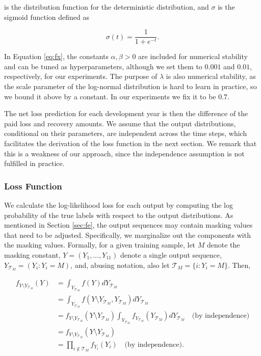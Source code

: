 \documentclass{article}
\begin{document}
is the distribution function for the deterministic distribution, and $\sigma$ 
is the sigmoid function defined as

\begin{equation}
    \sigma(t) = \frac{1}{1 + e^{-t}}.
\end{equation}

In Equation \ref{eq:fx}, the constants $\alpha, \beta > 0$ are included for 
numerical stability and can be tuned as hyperparameters, although we set them 
to $0.001$ and $0.01$, respectively, for our experiments. The purpose of 
$\lambda$ is also numerical stability, as the scale parameter of the log-normal
distribution is hard to learn in practice, so we bound it above by a constant. 
In our experiments we fix it to be $0.7$.

The net loss prediction for each development year is then the difference of the 
paid loss and recovery amounts. We assume that the output distributions, 
conditional on their parameters, are independent across the time steps, which 
facilitates the derivation of the loss function in the next section. We remark 
that this is a weakness of our approach, since the independence assumption is
not fulfilled in practice.

\subsubsection{Loss Function}\label{sec:loss-function}

We calculate the log-likelihood loss for each output by computing the log 
probability of the true labels with respect to the output distributions. As
mentioned in Section \ref{sec:fe}, the output sequences may contain masking 
values that need to be adjusted. Specifically, we marginalize out the components
with the masking values. Formally, for a given training sample, let $M$ denote 
the masking constant, $Y=(Y_1,\dots,Y_{11})$ denote a single output sequence,
$Y_{\mathcal{T}_M} = (Y_i: Y_i = M)$, and, abusing notation, also let 
$\mathcal{T}_M = \{i: Y_i = M\}$. Then,

\begin{align}
    f_{Y\setminus Y_{\mathcal{T}_M}}(Y) &= \int_{Y_{\mathcal{T}_M}} f(Y) dY_{\mathcal{T}_M}\\
         &= \int_{Y_{\mathcal{T}_M}} f(Y\setminus Y_{\mathcal{T}_M}, Y_{\mathcal{T}_M}) dY_{\mathcal{T}_M}\\
         &= f_{Y\setminus Y_{\mathcal{T}_M}}(Y\setminus Y_{\mathcal{T}_M}) \int_{Y_{\mathcal{T}_M}} f_{Y_{\mathcal{T}_M}}(Y_{\mathcal{T}_M}) dY_{\mathcal{T}_M} \quad \text{(by independence)}\\
         &= f_{Y\setminus Y_{\mathcal{T}_M}}(Y\setminus Y_{\mathcal{T}_M})\\
         &= \prod_{i \notin \mathcal{T}_M} f_{Y_i}(Y_i) \quad \text{(by independence)}.
\end{align}
\end{document}
